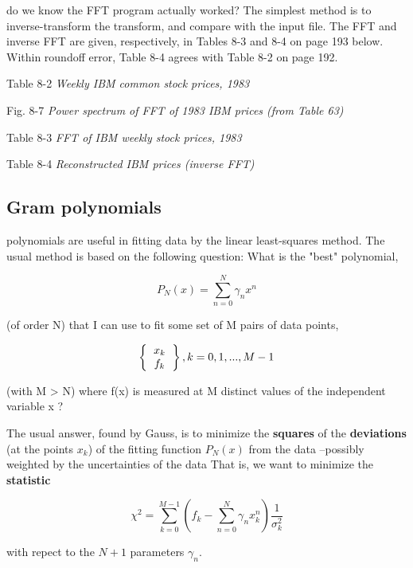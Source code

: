  do we know the FFT program actually worked? The simplest method is to inverse-transform the transform, and compare with the input file. The FFT and inverse FFT are given, respectively, in Tables 8-3 and 8-4 on page 193 below. Within roundoff error, Table 8-4 agrees with Table 8-2 on page 192.

Table 8-2 \textit{Weekly IBM common stock prices, 1983}

Fig. 8-7 \textit{Power spectrum of FFT of 1983 IBM prices (from Table 63)}

Table 8-3 \textit{FFT of IBM weekly stock prices, 1983}

Table 8-4 \textit{Reconstructed IBM prices (inverse FFT)}

\subsection{Gram polynomials}
 polynomials are useful in fitting data by the linear least-squares method. The usual method is based on the following question: What is the "best" polynomial,

\begin{equation}
P_N(x) = \sum_{n=0}^N \gamma_n x^n
\end{equation}

(of order N) that I can use to fit some set of M pairs of data points,

\begin{equation}
    \left \{
      \begin{tabular}{c}
      $x_{k}$ \\
      $f_{k}$
      \end{tabular}
    \right \}
    , k=0,1, ... , M-1
\end{equation}

(with M > N) where f(x) is measured at M distinct values of the independent variable x ?

The usual answer, found by Gauss, is to minimize the \textbf{squares} of the \textbf{deviations} (at the points $x_k$) of the fitting function $P_N(x)$ from the data --possibly weighted by the uncertainties of the data That is, we want to minimize the \textbf{statistic}

\begin{equation}
\chi^2 = \sum_{k=0}^{M-1} \left( f_k - \sum_{n=0}^{N} \gamma_n x_{k}^n \right) \frac{1}{\sigma_{k}^{2}}
\end{equation}

with repect to the $N + 1$ parameters $\gamma_{n}$.


